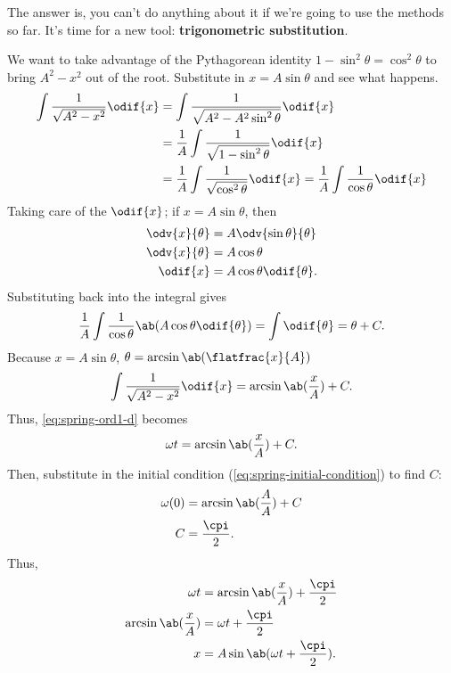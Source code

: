 The answer is, you can't do anything about it if we're going to use the methods so far. It's time for a new tool: \textbf{trigonometric substitution}.

We want to take advantage of the Pythagorean identity $1 - \sin^2\theta = \cos^2\theta$ to bring $A^2 - x^2$ out of the root. Substitute in $x = A\sin\theta$ and see what happens.
\begin{align}
	\int\frac{1}{\sqrt{A^2 - x^2}}\odif{x} & = \int\frac{1}{\sqrt{A^2 - A^2\sin^2\theta}}\odif{x}                                                 \\
	                                       & = \frac{1}{A}\int\frac{1}{\sqrt{1 - \sin^2\theta}}\odif{x}                                           \\
	                                       & = \frac{1}{A}\int\frac{1}{\sqrt{\cos^2\theta}}\odif{x} = \frac{1}{A}\int\frac{1}{\cos\theta}\odif{x}
\end{align}
Taking care of the $\odif{x}$; if $x = A\sin\theta$, then
\begin{align}
	\odv{x}{\theta} & = A\odv{\sin\theta}{\theta} \\
	\odv{x}{\theta} & = A\cos\theta               \\
	\odif{x}        & = A\cos\theta\odif{\theta}.
\end{align}
Substituting back into the integral gives
\begin{equation}
	\frac{1}{A}\int\frac{1}{\cos\theta}\ab(A\cos\theta\odif{\theta}) = \int\odif{\theta} = \theta + C.
\end{equation}
Because $x = A\sin\theta$, $\theta = \arcsin\ab(\flatfrac{x}{A})$
\begin{equation}
	\int\frac{1}{\sqrt{A^2 - x^2}}\odif{x} = \arcsin\ab(\frac{x}{A}) + C.
\end{equation}
Thus, \cref{eq:spring-ord1-d} becomes
\begin{equation}
	\omega t = \arcsin\ab(\frac{x}{A}) + C.
\end{equation}
Then, substitute in the initial condition (\cref{eq:spring-initial-condition}) to find $C$:
\begin{align}
	\omega(0) & = \arcsin\ab(\frac{A}{A}) + C \\
	C         & = \frac{\cpi}{2}.
\end{align}
Thus,
\begin{align}
	\omega t                & = \arcsin\ab(\frac{x}{A}) + \frac{\cpi}{2} \\
	\arcsin\ab(\frac{x}{A}) & = \omega t + \frac{\cpi}{2}                \\
	x                       & = A\sin\ab(\omega t + \frac{\cpi}{2}).
\end{align}
